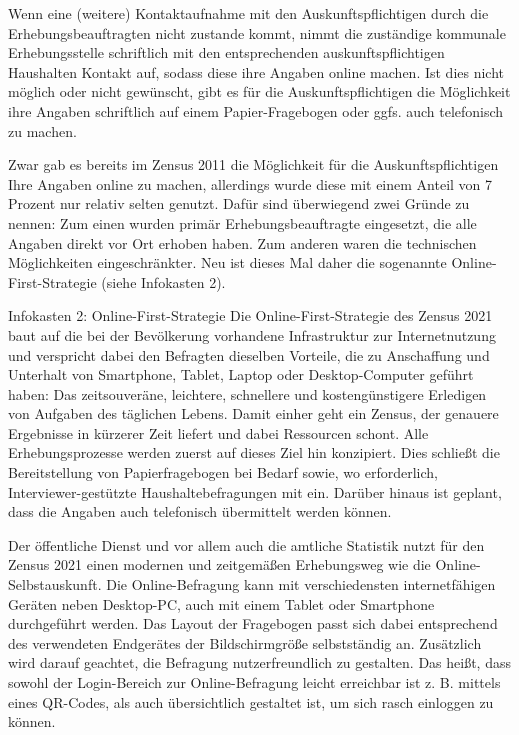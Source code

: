 Wenn eine (weitere) Kontaktaufnahme mit den Auskunftspflichtigen durch die Erhebungsbeauftragten nicht zustande kommt, nimmt die zuständige kommunale Erhebungsstelle schriftlich mit den entsprechenden auskunftspflichtigen Haushalten Kontakt auf, sodass diese ihre Angaben online machen. Ist dies nicht möglich oder nicht gewünscht, gibt es für die Auskunftspflichtigen die Möglichkeit ihre Angaben schriftlich auf einem Papier-Fragebogen oder ggfs. auch telefonisch zu machen.\par

Zwar gab es bereits im Zensus 2011 die Möglichkeit für die Auskunftspflichtigen Ihre Angaben online zu machen, allerdings wurde diese mit einem Anteil von 7 Prozent nur relativ selten genutzt. Dafür sind überwiegend zwei Gründe zu nennen: Zum einen wurden primär Erhebungsbeauftragte eingesetzt, die alle Angaben direkt vor Ort erhoben haben. Zum anderen waren die technischen Möglichkeiten eingeschränkter. Neu ist dieses Mal daher die sogenannte Online-First-Strategie (siehe Infokasten 2).\par

\begin{myblock}{Infokasten 2: Online-First-Strategie}
Die Online-First-Strategie des Zensus 2021 baut auf die bei der Bevölkerung vorhandene Infrastruktur zur Internetnutzung und verspricht dabei den Befragten dieselben Vorteile, die zu Anschaffung und Unterhalt von Smartphone, Tablet, Laptop oder Desktop-Computer geführt haben: Das zeitsouveräne, leichtere, schnellere und kostengünstigere Erledigen von Aufgaben des täglichen Lebens. Damit einher geht ein Zensus, der genauere Ergebnisse in kürzerer Zeit liefert und dabei Ressourcen schont. Alle Erhebungsprozesse werden zuerst auf dieses Ziel hin konzipiert. Dies schließt die Bereitstellung von Papierfragebogen bei Bedarf sowie, wo erforderlich, Interviewer-gestützte Haushaltebefragungen mit ein. Darüber hinaus ist geplant, dass die Angaben auch telefonisch übermittelt werden können.
\end{myblock}

Der öffentliche Dienst und vor allem auch die amtliche Statistik nutzt für den Zensus 2021 einen modernen und zeitgemäßen Erhebungsweg wie die Online-Selbstauskunft. Die Online-Befragung kann mit verschiedensten internetfähigen Geräten neben Desktop-PC, auch mit einem Tablet oder Smartphone durchgeführt werden. Das Layout der Fragebogen passt sich dabei entsprechend des verwendeten Endgerätes der Bildschirmgröße selbstständig an. Zusätzlich wird darauf geachtet, die Befragung nutzerfreundlich zu gestalten. Das heißt, dass sowohl der Login-Bereich zur Online-Befragung leicht erreichbar ist z. B. mittels eines QR-Codes, als auch übersichtlich gestaltet ist, um sich rasch einloggen zu können.\par

